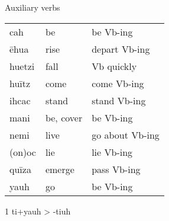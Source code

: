 \documentclass[12pt]{beamer}
\newcommand{\nah}[1]{\textcolor{nahgrn}{#1}}
\newcommand{\trs}[1]{\textcolor{nahblu}{#1}}
\begin{document}
\begin{frame}
\begin{columns}[t]
\begin{column}{.18\linewidth}
\begin{block}{Auxiliary verbs}
\begin{threeparttable}
\begin{tabular}{lll}
            \nah{cah}                & \trs{be}                    & \trs{be Vb-ing}          \\
            \nah{ēhua}               & \trs{rise}                  & \trs{depart   Vb-ing}    \\
            \nah{huetzi}             & \trs{fall}                  & \trs{Vb   quickly}       \\
            \nah{huītz}              & \trs{come}                  & \trs{come   Vb-ing}      \\
            \nah{ihcac}              & \trs{stand}                 & \trs{stand   Vb-ing}     \\
            \nah{mani}               & \trs{be, cover}             & \trs{be Vb-ing}          \\
            \nah{nemi}               & \trs{live}                  & \trs{go   about Vb-ing}  \\
            \nah{(on)oc}             & \trs{lie}                   & \trs{lie   Vb-ing}       \\
            \nah{quīza}              & \trs{emerge}                & \trs{pass   Vb-ing}      \\
            \nah{yauh}\tnote{1}      & \trs{go}                    & \trs{be Vb-ing}          \\
          \end{tabular}
          \begin{tablenotes}
            \item[1] \nah{ti+yauh} > \nah{-tiuh}
          \end{tablenotes}
        \end{threeparttable}


\end{block}
\end{column}
\end{columns}
\end{frame}
\end{document}
